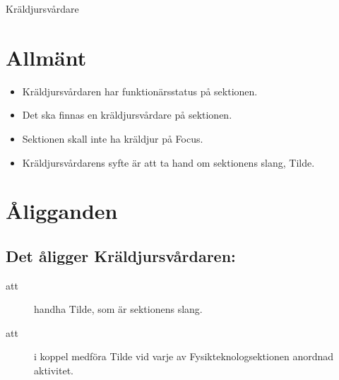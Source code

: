 \documentclass[a4paper]{article}
\begin{document}
\renewcommand{\forening}{Kräldjursvårdare} %

\begin{foreningenv}{\forening{}} %
    \section{Allmänt}
    \begin{itemize}
        \item Kräldjursvårdaren har funktionärsstatus på sektionen.
        \item Det ska finnas en kräldjursvårdare på sektionen.
        \item Sektionen skall inte ha kräldjur på Focus.
        \item Kräldjursvårdarens syfte är att ta hand om sektionens slang, Tilde.
    \end{itemize}
    
    \section{Åligganden}
    \aliggsektfunkt{}
    
    \subsection{Det åligger Kräldjursvårdaren:}
    \begin{description}
        \item[att] handha Tilde, som är sektionens slang.
        \item[att] i koppel medföra Tilde vid varje av Fysikteknologsektionen anordnad aktivitet.
    \end{description}
\end{foreningenv}
\end{document}
